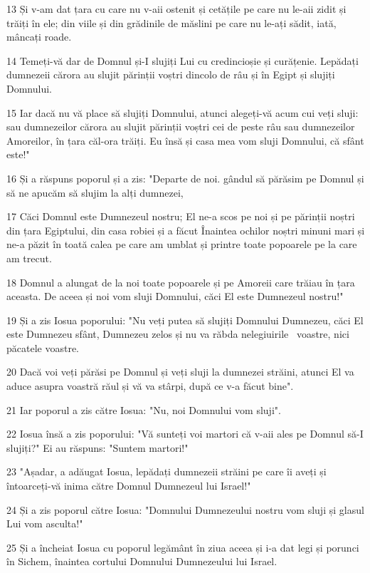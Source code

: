 \par 13 Și v-am dat țara cu care nu v-aii ostenit și cetățile pe care nu le-aii zidit și trăiți în ele; din viile și din grădinile de măslini pe care nu le-ați sădit, iată, mâncați roade.
\par 14 Temeți-vă dar de Domnul și-I slujiți Lui cu credincioșie și curățenie. Lepădați dumnezeii cărora au slujit părinții voștri dincolo de râu și în Egipt și slujiți Domnului.
\par 15 Iar dacă nu vă place să slujiți Domnului, atunci alegeți-vă acum cui veți sluji: sau dumnezeilor cărora au slujit părinții voștri cei de peste râu sau dumnezeilor Amoreilor, în țara căl-ora trăiți. Eu însă și casa mea vom sluji Domnului, că sfânt este!"
\par 16 Și a răspuns poporul și a zis: "Departe de noi. gândul să părăsim pe Domnul și să ne apucăm să slujim la alți dumnezei,
\par 17 Căci Domnul este Dumnezeul nostru; El ne-a scos pe noi și pe părinții noștri din țara Egiptului, din casa robiei și a făcut Înaintea ochilor noștri minuni mari și ne-a păzit în toată calea pe care am umblat și printre toate popoarele pe la care am trecut.
\par 18 Domnul a alungat de la noi toate popoarele și pe Amoreii care trăiau în țara aceasta. De aceea și noi vom sluji Domnului, căci El este Dumnezeul nostru!"
\par 19 Și a zis Iosua poporului: "Nu veți putea să slujiți Domnului Dumnezeu, căci El este Dumnezeu sfânt, Dumnezeu zelos și nu va răbda nelegiuirile  voastre, nici păcatele voastre.
\par 20 Dacă voi veți părăsi pe Domnul și veți sluji la dumnezei străini, atunci El va aduce asupra voastră răul și vă va stârpi, după ce v-a făcut bine".
\par 21 Iar poporul a zis către Iosua: "Nu, noi Domnului vom sluji".
\par 22 Iosua însă a zis poporului: "Vă sunteți voi martori că v-aii ales pe Domnul să-I slujiți?" Ei au răspuns: "Suntem martori!"
\par 23 "Așadar, a adăugat Iosua, lepădați dumnezeii străini pe care îi aveți și întoarceți-vă inima către Domnul Dumnezeul lui Israel!"
\par 24 Și a zis poporul către Iosua: "Domnului Dumnezeului nostru vom sluji și glasul Lui vom asculta!"
\par 25 Și a încheiat Iosua cu poporul legământ în ziua aceea și i-a dat legi și porunci în Sichem, înaintea cortului Domnului Dumnezeului lui Israel.
